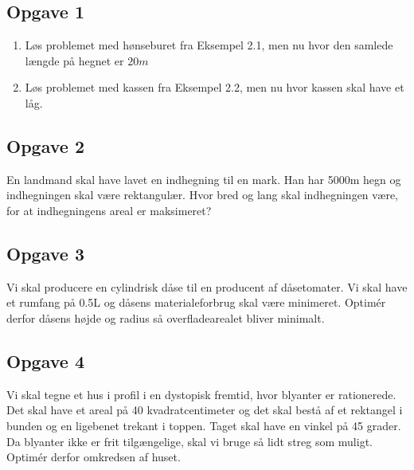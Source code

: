 \subsection*{Opgave 1}
\begin{enumerate}[label=\roman*)]
\item Løs problemet med hønseburet fra Eksempel 2.1, men nu hvor den samlede længde på hegnet er $20m$
\item Løs problemet med kassen fra Eksempel 2.2, men nu hvor kassen skal have et låg.

\end{enumerate}

\subsection*{Opgave 2}
En landmand skal have lavet en indhegning til en mark. Han har 5000m hegn og indhegningen skal være rektangulær. Hvor bred og lang skal indhegningen være, for at indhegningens areal er maksimeret?

\subsection*{Opgave 3}
Vi skal producere en cylindrisk dåse til en producent af dåsetomater. Vi skal have et rumfang på 0.5L og dåsens materialeforbrug skal være minimeret. Optimér derfor dåsens højde og radius så overfladearealet bliver minimalt. 

\subsection*{Opgave 4}
Vi skal tegne et hus i profil i en dystopisk fremtid, hvor blyanter er rationerede. Det skal have et areal på 40 kvadratcentimeter og det skal bestå af et rektangel i bunden og en ligebenet trekant i toppen. Taget skal have en vinkel på 45 grader. Da blyanter ikke er frit tilgængelige, skal vi bruge så lidt streg som muligt. Optimér derfor omkredsen af huset. 

